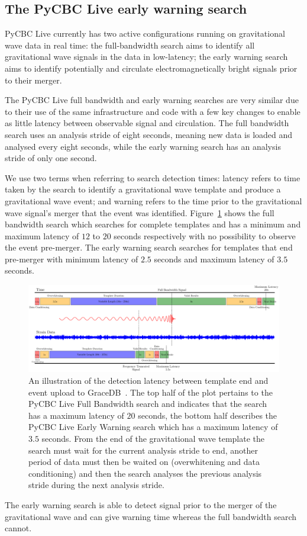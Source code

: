 \subsection{\label{6:sec:pycbc-ew-search}The PyCBC Live early warning search}

PyCBC Live currently has two active configurations running on gravitational wave data in real time: the full-bandwidth search aims to identify all gravitational wave signals in the data in low-latency; the early warning search aims to identify potentially and circulate electromagnetically bright signals prior to their merger.

The PyCBC Live full bandwidth and early warning searches are very similar due to their use of the same infrastructure and code with a few key changes to enable as little latency between observable signal and circulation. The full bandwidth search uses an analysis stride of eight seconds, meaning new data is loaded and analysed every eight seconds, while the early warning search has an analysis stride of only one second.

We use two terms when referring to search detection times: latency refers to time taken by the search to identify a gravitational wave template and produce a gravitational wave event; and warning refers to the time prior to the gravitational wave signal's merger that the event was identified. Figure~\ref{6:fig:latency_plot} shows the full bandwidth search which searches for complete templates and has a minimum and maximum latency of $12$ to $20$ seconds respectively with no possibility to observe the event pre-merger. The early warning search searches for templates that end pre-merger with minimum latency of $2.5$ seconds and maximum latency of $3.5$ seconds.
%
\begin{figure}
    \centering
    \includegraphics[width=\textwidth]{images/6_earlywarning/gw170817/latency_plot.pdf}
    \caption{An illustration of the detection latency between template end and event upload to GraceDB~\cite{ligo_gracedb:2024}. The top half of the plot pertains to the PyCBC Live Full Bandwidth search and indicates that the search has a maximum latency of $20$ seconds, the bottom half describes the PyCBC Live Early Warning search which has a maximum latency of $3.5$ seconds. From the end of the gravitational wave template the search must wait for the current analysis stride to end, another period of data must then be waited on (overwhitening and data conditioning) and then the search analyses the previous analysis stride during the next analysis stride.}
    \label{6:fig:latency_plot}
\end{figure}
%
The early warning search is able to detect signal prior to the merger of the gravitational wave and can give warning time whereas the full bandwidth search cannot.


